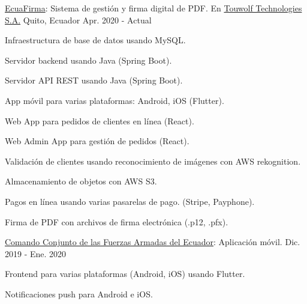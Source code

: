 
\begin{cventries}

  \cventry
    {\href{https://ecuafirma.com}{EcuaFirma}: Sistema de gestión y firma digital de PDF.} %
    {En \href{https://touwolf.com/}{Touwolf Technologies S.A.}} %
    {Quito, Ecuador} %
    {Apr. 2020 - Actual} %
    {
      \begin{cvitems} %
        \item {Infraestructura de base de datos usando MySQL.}
        \item {Servidor backend usando Java (Spring Boot).}
        \item {Servidor API REST usando Java (Spring Boot).}
        \item {App móvil para varias plataformas: Android, iOS (Flutter).}
        \item {Web App para pedidos de clientes en línea (React).}
        \item {Web Admin App para gestión de pedidos (React).}
        \item {Validación de clientes usando reconocimiento de imágenes con AWS rekognition.}
        \item {Almacenamiento de objetos con AWS S3.}
        \item {Pagos en línea usando varias pasarelas de pago. (Stripe, Payphone).}
        \item {Firma de PDF con archivos de firma electrónica (.p12, .pfx).}
      \end{cvitems}
    }

  \cventry
    {\href{https://www.ccffaa.mil.ec/}{Comando Conjunto de las Fuerzas Armadas del Ecuador}: Aplicación móvil.} %
    {} %
    {} %
    {Dic. 2019 - Ene. 2020} %
    {
      \begin{cvitems} %
        \item {Frontend para varias plataformas (Android, iOS) usando Flutter.}
        \item {Notificaciones push para Android e iOS.}
      \end{cvitems}
    }


\end{cventries}
